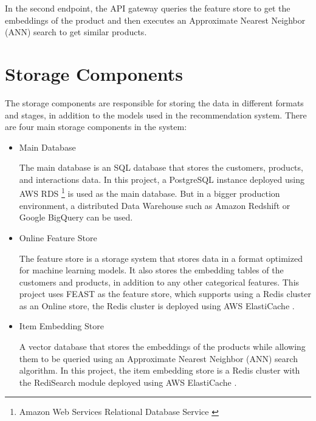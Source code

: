 In the second endpoint, the API gateway queries the feature store to get the embeddings of the product and then executes an Approximate Nearest Neighbor (ANN) search to get similar products.

\section{Storage Components}

The storage components are responsible for storing the data in different formats and stages, in addition to the models used in the recommendation system.
There are four main storage components in the system:

\begin{itemize}
    \item Main Database
    \begin{displayquote}
        The main database is an SQL database that stores the customers, products, and
         interactions data. In this project, a PostgreSQL \cite{Postgres} instance 
         deployed using AWS RDS \footnote{Amazon Web Services Relational Database Service \cite{AwsRDS}}
         is used as the main database. 
         But in a bigger production environment, a distributed Data Warehouse such as 
         Amazon Redshift \cite{AwsRedshift} or Google BigQuery \cite{GoogleBigQuery} can be used.
    \end{displayquote}
    \item Online Feature Store
    \begin{displayquote}
        The feature store is a storage system that stores data in a format optimized for machine learning models. \cite{NvidiaFeatureStores}
        It also stores the embedding tables of the customers 
        and products, in addition to any other categorical features.
        This project uses FEAST \cite{feast} as the feature store, which supports using a Redis \cite{Redis} 
        cluster as an Online store, the Redis cluster is deployed using AWS ElastiCache \cite{AwsElastiCache}.
    \end{displayquote}

    \item Item Embedding Store
    \begin{displayquote}
        A vector database that stores the embeddings of the products
         while allowing them to be queried using an Approximate Nearest Neighbor (ANN) search algorithm. 
        In this project, the item embedding store is a Redis \cite{Redis} cluster with the RediSearch \cite{RediSearch} module deployed using AWS ElastiCache \cite{AwsElastiCache}.
    \end{displayquote}


\end{itemize}
